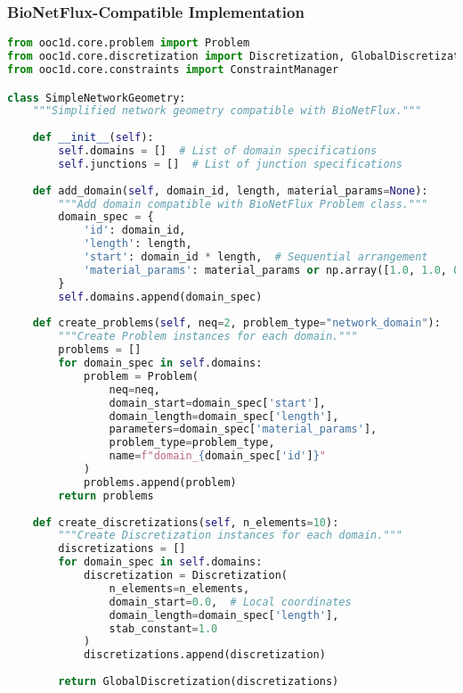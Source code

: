 \subsubsection{BioNetFlux-Compatible Implementation}

\begin{lstlisting}[language=Python, caption=Corrected Network Integration]
from ooc1d.core.problem import Problem
from ooc1d.core.discretization import Discretization, GlobalDiscretization
from ooc1d.core.constraints import ConstraintManager

class SimpleNetworkGeometry:
    """Simplified network geometry compatible with BioNetFlux."""
    
    def __init__(self):
        self.domains = []  # List of domain specifications
        self.junctions = []  # List of junction specifications
    
    def add_domain(self, domain_id, length, material_params=None):
        """Add domain compatible with BioNetFlux Problem class."""
        domain_spec = {
            'id': domain_id,
            'length': length,
            'start': domain_id * length,  # Sequential arrangement
            'material_params': material_params or np.array([1.0, 1.0, 0.0, 1.0])
        }
        self.domains.append(domain_spec)
    
    def create_problems(self, neq=2, problem_type="network_domain"):
        """Create Problem instances for each domain."""
        problems = []
        for domain_spec in self.domains:
            problem = Problem(
                neq=neq,
                domain_start=domain_spec['start'],
                domain_length=domain_spec['length'],
                parameters=domain_spec['material_params'],
                problem_type=problem_type,
                name=f"domain_{domain_spec['id']}"
            )
            problems.append(problem)
        return problems
    
    def create_discretizations(self, n_elements=10):
        """Create Discretization instances for each domain."""
        discretizations = []
        for domain_spec in self.domains:
            discretization = Discretization(
                n_elements=n_elements,
                domain_start=0.0,  # Local coordinates
                domain_length=domain_spec['length'],
                stab_constant=1.0
            )
            discretizations.append(discretization)
        
        return GlobalDiscretization(discretizations)
    

\end{lstlisting}
